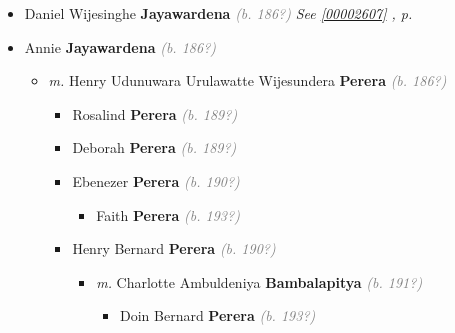 \documentclass[10pt, openany]{book}
\begin{document}
\begin{itemize}
{\begin{itemize}
{\begin{itemize}
{\begin{itemize}
{\begin{itemize}
{\begin{itemize}
{\begin{itemize}
{\begin{itemize}
{  }
\end{itemize}}
\end{itemize}
    }
\item{Timothy Lloyd Perera  \textbf{Wanigatunga} \textcolor{gray}{\textit{(b. 192?)}}
   }
\end{itemize}}
\end{itemize}
  }
\end{itemize}}
\end{itemize}
  }
\item{Daniel Wijesinghe \textbf{Jayawardena} \textcolor{gray}{\textit{(b. 186?)}} \textcolor{slteal}{\textit{See  \autoref{00002607} \textit{, p. \pageref{00002607} }}}}
\item{Annie \textbf{Jayawardena} \textcolor{gray}{\textit{(b. 186?)}}
\begin{itemize}
\item{\textit{m.} Henry Udunuwara Urulawatte Wijesundera \textbf{Perera} \textcolor{gray}{\textit{(b. 186?)}}   \label{couple:00003215:00003216} \begin{itemize}
\item{Rosalind  \textbf{Perera} \textcolor{gray}{\textit{(b. 189?)}}
 }
\item{Deborah  \textbf{Perera} \textcolor{gray}{\textit{(b. 189?)}}
 }
\item{Ebenezer  \textbf{Perera} \textcolor{gray}{\textit{(b. 190?)}}
\begin{itemize}
\item{Faith \textbf{Perera} \textcolor{gray}{\textit{(b. 193?)}}
 }
\end{itemize}
 }
\item{Henry Bernard  \textbf{Perera} \textcolor{gray}{\textit{(b. 190?)}}
\begin{itemize}
\item{\textit{m.} Charlotte Ambuldeniya \textbf{Bambalapitya} \textcolor{gray}{\textit{(b. 191?)}}   \label{couple:00003228:00003229} \begin{itemize}
\item{Doin Bernard  \textbf{Perera} \textcolor{gray}{\textit{(b. 193?)}}
\begin{itemize}

\end{itemize}}
\end{itemize}}
\end{itemize}}
\end{itemize}}
\end{itemize}}
\end{itemize}}
\end{itemize}
\end{document}
